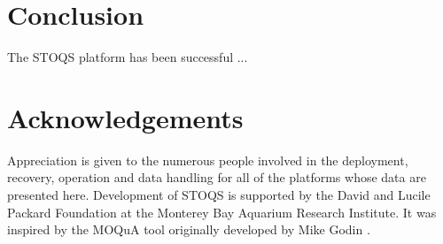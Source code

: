 \documentclass[conference]{IEEEtran}
\begin{document}
%





\section{Conclusion}
The STOQS platform has been successful ...







\section*{Acknowledgements}

Appreciation is given to the numerous people involved in the deployment, recovery, operation and data handling for all of the platforms whose data are presented here. Development of STOQS is supported by the David and Lucile Packard Foundation at the Monterey Bay Aquarium Research Institute. It was inspired by the MOQuA tool originally developed by Mike Godin \cite{godin05}.
\end{document}
